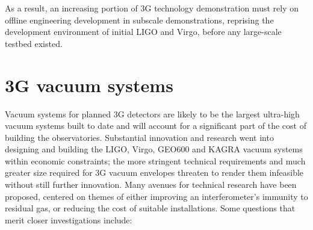 As a result, an increasing portion of 3G technology demonstration must rely on offline engineering development in subscale demonstrations, reprising the  development environment of initial LIGO and Virgo, before any large-scale testbed existed. 

\section{3G vacuum systems}
Vacuum systems for planned 3G detectors are likely to be the largest ultra-high vacuum systems built to date and will account for a significant part of the cost of building the observatories. Substantial innovation and research went into designing and building the LIGO, Virgo, GEO600 and KAGRA vacuum systems within economic constraints; the more stringent technical requirements and much greater size required for 3G vacuum envelopes threaten to render them infeasible without still further innovation. Many avenues for technical research have been proposed,  centered on themes of either improving an interferometer’s immunity to residual gas, or reducing the cost of suitable installations. Some questions that merit closer investigations include:

